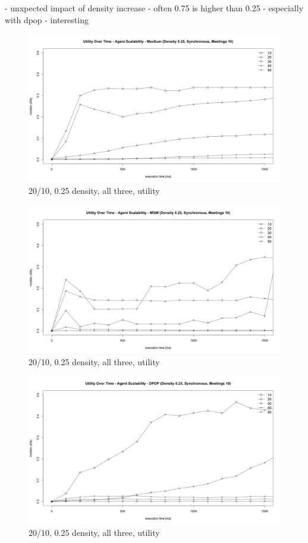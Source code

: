 - unxpected impact of density increase
- often 0.75 is higher than 0.25
- especially with dpop
- interesting
\begin{figure}[H]
\centering
\includegraphics[width=430px]{graphics/experiments/static/st_8}
\caption{20/10, 0.25 density, all three, utility}
\label{fig:mgm_graph}
\end{figure}
\begin{figure}[H]
\centering
\includegraphics[width=430px]{graphics/experiments/static/st_9}
\caption{20/10, 0.25 density, all three, utility}
\label{fig:mgm_graph}
\end{figure}
\begin{figure}[H]
\centering
\includegraphics[width=430px]{graphics/experiments/static/st_10}
\caption{20/10, 0.25 density, all three, utility}
\label{fig:mgm_graph}
\end{figure}

